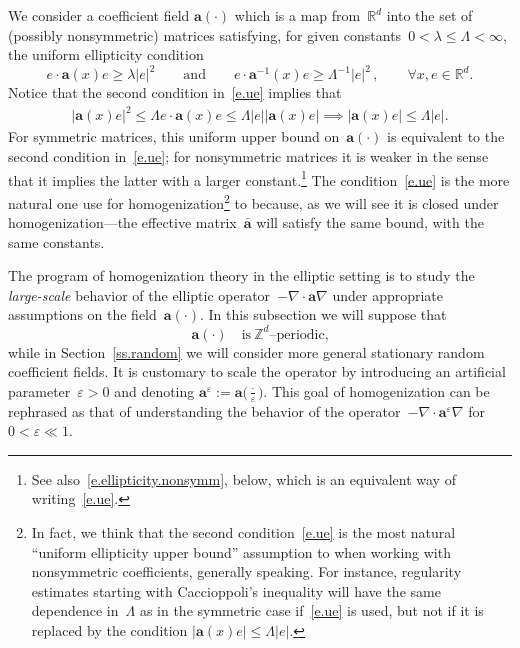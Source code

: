 \documentclass[11pt]{article} %
\numberwithin{equation}{section}
\theoremstyle{definition}
\newcommand*{\R}{\ensuremath{\mathbb{R}}}
\newcommand*{\Zd}{\ensuremath{\mathbb{Z}^d}}
\newcommand*{\Rd}{\ensuremath{\mathbb{R}^d}}
\newcommand{\eps}{\varepsilon}
\newcommand{\ep}{\eps}
\renewcommand{\a}{\mathbf{a}}
\newcommand{\ahom}{\bar{\a}}
\begin{document}
\smallskip

We consider a coefficient field $\a(\cdot)$ which is a map from~$\Rd$ into the set of (possibly nonsymmetric) matrices satisfying, for given constants~$0 < \lambda\leq \Lambda <\infty$, the uniform ellipticity condition
\begin{equation}
\label{e.ue}
e\cdot \a(x) e
\geq \lambda |e|^2 
\qquad \mbox{and} \qquad
e \cdot \a^{-1} (x) e 
\geq \Lambda^{-1}  |e|^2 
\,,
\qquad 
\forall x,e\in\R^d. 
\end{equation}
Notice that the second condition in~\eqref{e.ue} implies that 
\begin{align*}
| \a(x) e |^2
\leq\Lambda e \cdot \a(x) e 
\leq 
\Lambda |e| |\a(x) e| \implies | \a(x) e | \leq \Lambda |e|.
\end{align*}
For symmetric matrices, this uniform upper bound on~$\a(\cdot)$ is equivalent to the second condition in~\eqref{e.ue}; for nonsymmetric matrices it is weaker in the sense that it implies the latter with a larger constant.\footnote{See also~\eqref{e.ellipticity.nonsymm}, below, which is an equivalent way of writing~\eqref{e.ue}.} 
The condition~\eqref{e.ue} is the more natural one use for homogenization\footnote{In fact, we think that the second condition~\eqref{e.ue} is the most natural ``uniform ellipticity upper bound'' assumption to when working with nonsymmetric coefficients, generally speaking. For instance, regularity estimates starting with Caccioppoli's inequality will have the same dependence in~$\Lambda$ as in the symmetric case if~\eqref{e.ue} is used, but not if it is replaced by the condition $|\a(x)e| \leq \Lambda |e|$.} to  because, as we will see it is closed under homogenization---the effective matrix~$\ahom$ will satisfy the same bound, with the same constants.

\smallskip

The program of homogenization theory in the elliptic setting is to study the \emph{large-scale} behavior of the elliptic operator~$-\nabla \cdot \a\nabla$ under appropriate assumptions on the field~$\a(\cdot)$. 
In this subsection we will suppose that
\begin{equation}
\a(\cdot) \quad \mbox{is} \ \mbox{$\Zd$--periodic,}
\end{equation}
while in Section~\ref{ss.random} we will consider more general stationary random coefficient fields.  
It is customary to scale the operator  by introducing an artificial parameter~$\ep>0$ and denoting $\a^\ep:=\a\bigl(\tfrac \cdot \ep \bigr)$. This goal of homogenization can be rephrased as that of understanding the behavior of the operator~$-\nabla \cdot \a^\ep \nabla$ for $0< \ep \ll 1$. 
\end{document}
